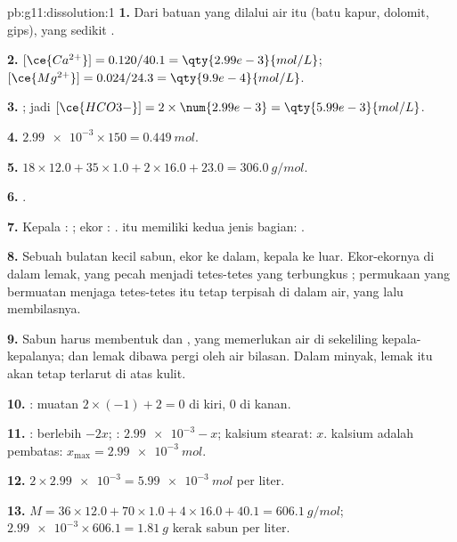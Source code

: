 \begin{solution}{pb:g11:dissolution:1}
\textbf{1.} Dari batuan yang dilalui air itu (batu kapur, dolomit,
gips), yang sedikit .

\textbf{2.} $[\ce{Ca^{2+}}] = 0.120 / 40.1 = \qty{2.99e-3}{mol/L}$;
$[\ce{Mg^{2+}}] = 0.024 / 24.3 = \qty{9.9e-4}{mol/L}$.

\textbf{3.} ; jadi
$[\ce{HCO3-}] = 2 \times \num{2.99e-3} = \qty{5.99e-3}{mol/L}$.

\textbf{4.} $\num{2.99e-3} \times 150 = \qty{0.449}{mol}$.

\textbf{5.} $18 \times 12.0 + 35 \times 1.0 + 2 \times 16.0 + 23.0 =
\qty{306.0}{g/mol}$.

\textbf{6.} .

\textbf{7.} Kepala : ; ekor :
.  itu memiliki kedua jenis bagian: .

\textbf{8.} Sebuah bulatan kecil  sabun, ekor ke dalam, kepala ke
luar. Ekor-ekornya  di dalam lemak, yang pecah menjadi tetes-tetes
yang terbungkus ; permukaan yang bermuatan menjaga tetes-tetes itu
tetap terpisah di dalam air, yang lalu membilasnya.

\textbf{9.} Sabun harus membentuk  dan , yang memerlukan air di
sekeliling kepala-kepalanya; dan lemak dibawa pergi oleh air bilasan.
Dalam minyak, lemak itu akan tetap terlarut di atas kulit.

\textbf{10.} : muatan
$2 \times (-1) + 2 = 0$ di kiri, $0$ di kanan.

\textbf{11.} : berlebih $- 2x$; :
$\num{2.99e-3} - x$; kalsium stearat: $x$.  kalsium adalah
pembatas: $x_{\max} = \qty{2.99e-3}{mol}$.

\textbf{12.} $2 \times \num{2.99e-3} = \qty{5.99e-3}{mol}$ per liter.

\textbf{13.} $M = 36 \times 12.0 + 70 \times 1.0 + 4 \times 16.0 + 40.1 =
\qty{606.1}{g/mol}$; $\num{2.99e-3} \times 606.1 = \qty{1.81}{g}$ kerak
sabun per liter.


\end{solution}
